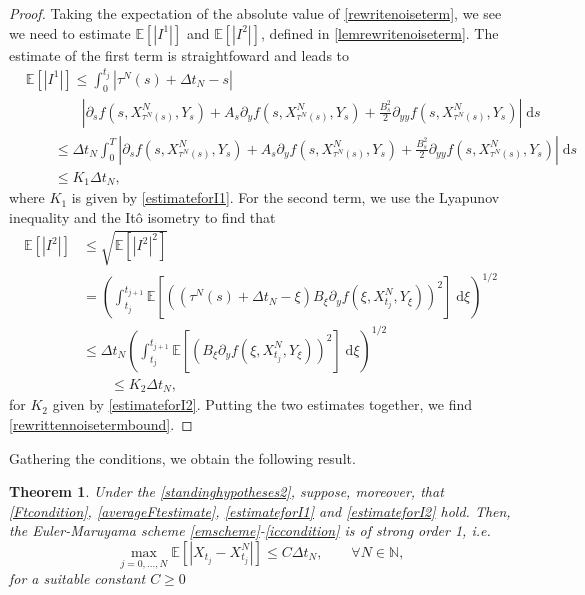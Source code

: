 \documentclass[reqno,12pt]{amsart}
\theoremstyle{plain}%
\newtheorem{thm}{Theorem}[section]
\theoremstyle{definition}
\begin{document}
\begin{proof}
    Taking the expectation of the absolute value of \eqref{rewritenoiseterm}, we see we need to estimate $\mathbb{E}[|I^1|]$ and $\mathbb{E}[|I^2|]$, defined in \cref{lemrewritenoiseterm}. The estimate of the first term is straightfoward and leads to
    \begin{align*}
        & \mathbb{E}[|I^1|] \leq \int_0^{t_j} |\tau^N(s) + \Delta t_N - s| \\
        & \qquad \qquad \left|\partial_s f(s, X_{\tau^N(s)}^N, Y_s) + A_s \partial_y f(s, X_{\tau^N(s)}^N, Y_s)  + \frac{B_s^2}{2}\partial_{yy}f(s, X_{\tau^N(s)}^N, Y_s) \right| \;\mathrm{d}s \\
        & \qquad \leq \Delta t_N \int_0^{T}\left|\partial_s f(s, X_{\tau^N(s)}^N, Y_s) + A_s \partial_y f(s, X_{\tau^N(s)}^N, Y_s)  + \frac{B_s^2}{2}\partial_{yy}f(s, X_{\tau^N(s)}^N, Y_s) \right| \;\mathrm{d}s \\
        & \qquad \leq K_1 \Delta t_N,
    \end{align*}
    where $K_1$ is given by \eqref{estimateforI1}. For the second term, we use the Lyapunov inequality and the It\^o isometry to find that
    \begin{align*}
        \mathbb{E}[|I^2|] & \leq \sqrt{\mathbb{E}[|I^2|^2]} \\
        & = \left(\int_{t_j}^{t_{j+1}}  \mathbb{E}\left[\left((\tau^N(s) + \Delta t_N - \xi) B_\xi \partial_y f(\xi, X_{t_j}^N, Y_\xi)\right)^2\right] \;\mathrm{d}\xi \right)^{1/2} \\
        & \leq \Delta t_N \left(\int_{t_j}^{t_{j+1}}  \mathbb{E}\left[\left(B_\xi \partial_y f(\xi, X_{t_j}^N, Y_\xi)\right)^2\right] \;\mathrm{d}\xi \right)^{1/2} \\
        & \qquad \leq K_2 \Delta t_N,
    \end{align*}
    for $K_2$ given by \eqref{estimateforI2}. Putting the two estimates together, we find \eqref{rewrittennoisetermbound}.
\end{proof}

Gathering the conditions, we obtain the following result.
\begin{thm}
    \label{thmforItonoise}
    Under the \cref{standinghypotheses2}, suppose, moreover, that \eqref{Ftcondition}, \eqref{averageFtestimate}, \eqref{estimateforI1} and \eqref{estimateforI2} hold. Then, the Euler-Maruyama scheme \eqref{emscheme}-\eqref{iccondition} is of strong order 1, i.e.
    \begin{equation}
      \label{thmitogeneralboundstrongorder}
        \max_{j=0, \ldots, N}\mathbb{E}\left[ \left| X_{t_j} - X_{t_j}^N \right| \right] \leq C \Delta t_N, \qquad \forall N \in \mathbb{N},
    \end{equation}
    for a suitable constant $C \geq 0$
\end{thm}
\end{document}
